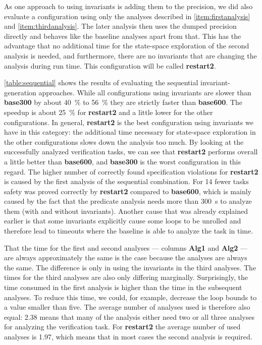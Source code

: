 As one approach to using invariants is adding them to the precision, we did also evaluate a configuration using only the analyses described in \autoref{item:firstanalysis}
and \autoref{item:thirdanalysis}. The later analysis then uses the dumped precision directly and behaves like the baseline analyses apart from that. This has the advantage
that no additional time for the state-space exploration of the second analysis is needed, and furthermore, there are no invariants that are changing the analysis during run
time. This configuration will be called \textbf{restart2}.



\autoref{table:sequential} shows the results of evaluating the sequential invariant-generation approaches. While all configurations using invariants are slower than \textbf{base300} by about \SI{40}{\percent} to 
\SI{56}{\percent} they are strictly faster than \textbf{base600}. The speedup is about \SI{25}{\percent} for \textbf{restart2} and a little lower for the other configurations. In general, \textbf{restart2} is the best 
configuration using invariants we have in this category: the additional time necessary for state-space exploration in the other configurations slows down the analysis too much. By looking at the 
successfully analyzed verification tasks, we can see that \textbf{restart2} performs overall a little better than \textbf{base600}, and \textbf{base300} is the worst configuration in this regard. The 
higher number of correctly found specification violations for \textbf{restart2} is caused by the first analysis of the sequential combination. For \num{14} fewer tasks safety was proved correctly by \textbf{restart2} compared to 
\textbf{base600}, which is mainly caused by the fact that the predicate analysis needs more than \SI{300}{\second} to analyze them (with and without invariants). Another cause that was already 
explained earlier is that some invariants explicitly cause some loops to be unrolled and therefore lead to timeouts where the baseline is able to analyze the task in time.

That the time for the first and second analyses --- columns \textbf{Alg1} and \textbf{Alg2} --- are always approximately the same is the case because the analyses are always the same. The difference
is only in using the invariants in the third analyses. The times for the third analyses are also only differing marginally. Surprisingly, the time consumed in the first analysis is higher than the time in 
the subsequent analyses. To reduce this time, we could, for example, decrease the loop bounds to a value smaller than five. The average number of analyses used is therefore also equal: 2.38 means that 
many of the analysis either need two or all three analyses for analyzing the verification task. For \textbf{restart2} the average number of used analyses is 1.97, which means that in most cases the second
analysis is required.

